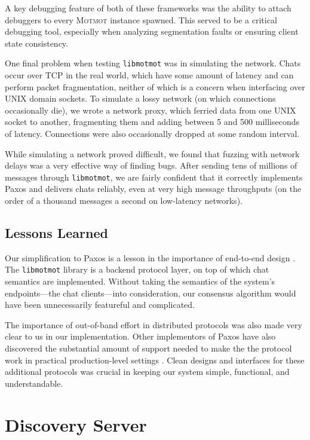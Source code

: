\documentclass{sig-alternate}
\newcommand\Motmot{\textsc{Motmot}\xspace}
\newcommand\libmotmot{\texttt{libmotmot}\xspace}
\begin{document}
A key debugging feature of both of these frameworks was the ability to attach
debuggers to every \Motmot instance spawned. This served to be a critical
debugging tool, especially when analyzing segmentation faults or ensuring client
state consistency.

One final problem when testing \libmotmot was in simulating the network.  Chats
occur over TCP in the real world, which have some amount of latency and can
perform packet fragmentation, neither of which is a concern when interfacing
over UNIX domain sockets. To simulate a lossy network (on which connections
occasionally die), we wrote a network proxy, which ferried data from one UNIX
socket to another, fragmenting them and adding between 5 and 500 milliseconds of
latency. Connections were also occasionally dropped at some random interval.

While simulating a network proved difficult, we found that fuzzing with network
delays was a very effective way of finding bugs. After sending tens of millions
of messages through \libmotmot, we are fairly confident that it correctly
implements Paxos and delivers chats reliably, even at very high message
throughputs (on the order of a thousand messages a second on low-latency
networks).

\subsection{Lessons Learned}

Our simplification to Paxos is a lesson in the importance of end-to-end design
\cite{end2end}.  The \libmotmot library is a backend protocol layer, on top of
which chat semantics are implemented.  Without taking the semantics of the
system's endpoints---the chat clients---into consideration, our consensus
algorithm would have been unnecessarily featureful and complicated.

The importance of out-of-band effort in distributed protocols was also made
very clear to us in our implementation.  Other implementors of Paxos have also
discovered the substantial amount of support needed to make the the protocol
work in practical production-level settings \cite{paxlive}.  Clean designs
and interfaces for these additional protocols was crucial in keeping our
system simple, functional, and understandable.

\section{Discovery Server}
\end{document}
